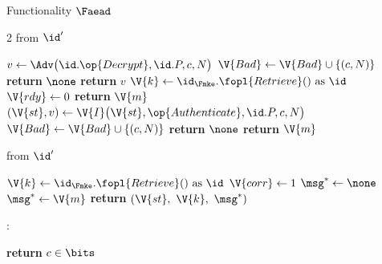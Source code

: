 \begin{interface}[nofloat]{Functionality $\Faead$ \\
}
{\begin{multicols}{2}
 \quad from $\id'$
\begin{algorithmic}[1]
\algcont
{}
  \State $v \gets \Adv\bigl(\id.\op{Decrypt}, \id.P, c, N\bigr)$ \label{ln:aeinject}
    \State $\V{Bad} \gets \V{Bad} \cup \{(c, N)\}$
    \State \textbf{return} $\none$
  \EndIf
  \State \textbf{return} $v$
\EndIf
\State $\V{k} \gets \id_{\Fmke}.\fopl{Retrieve}() \text{ as } \id$
 \label{ln:aenotself}
 \label{ln:aeoncemore}
\State $\V{rdy} \gets 0$
  \State \textbf{return} $\V{m}$ \label{ln:aecorrect}
\EndIf
\State $(\V{st}, v) \gets \V{I}\bigl(\V{st}, \op{Authenticate}, \id.P, c, N\bigr)$ \label{ln:aeauth}
  \State $\V{Bad} \gets \V{Bad} \cup \{(c, N)\}$
  \State \textbf{return} $\none$ \label{ln:aereject}
\EndIf
\State \textbf{return} $\V{m}$ \label{ln:aediffmac}
\algsave
\end{algorithmic}
\vspace{1.4ex}

\columnbreak

 \quad from $\id'$
\begin{algorithmic}[1]
\algcont
{}
\State $\V{k} \gets \id_{\Fmke}.\fopl{Retrieve}() \text{ as } \id$ \label{ln:aeleakkey}
\State $\V{corr} \gets 1$ \label{ln:aecorrupt}
\State $\msg^{*} \gets \none$
  \State $\msg^{*} \gets \V{m}$ \label{ln:aelastplain}
\EndIf
\State \textbf{return} $(\V{st},\ \V{k},\ \msg^{*})$ \label{ln:aereport}
\algsave
\end{algorithmic}
\vspace{1.4ex}

:
\begin{algorithmic}[1]
\algcont
\State \textbf{return} $c \in \bits$
\algsave
\end{algorithmic}
\end{multicols}}
\end{interface}
